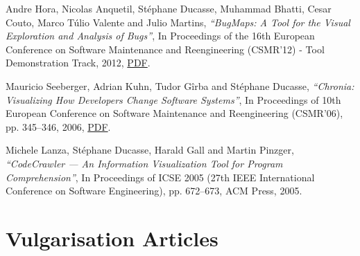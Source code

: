 \documentclass{article}
\newcommand{\czauthors}[1]{#1}
\newcommand{\cztitle}[1]{\emph{``#1''}}
\newcommand{\czbooktitle}[1]{#1}
\begin{document}
\begin{itemize}

	\pub  \czauthors{Andre Hora, Nicolas Anquetil, St\'ephane Ducasse, Muhammad Bhatti, Cesar Couto, Marco T\'ulio Valente and Julio Martins},  \cztitle{BugMaps: A Tool for the Visual Exploration and Analysis of Bugs},  In \czbooktitle{Proceedings of the 16th European Conference on Software Maintenance and Reengineering (CSMR'12) - Tool Demonstration Track}, 2012, \href{http://rmod-files.lille.inria.fr/Team/Texts/Papers/Hora12a-Official-CSMR2012Tools-BugMaps.pdf}{PDF}.

	\pub  \czauthors{Mauricio Seeberger, Adrian Kuhn, Tudor G\^irba and St\'ephane Ducasse},  \cztitle{{Chronia}: Visualizing How Developers Change Software Systems},  In \czbooktitle{Proceedings of 10th European Conference on Software Maintenance and Reengineering (CSMR'06)}, pp. 345--346, 2006, \href{http://rmod-files.lille.inria.fr/Team/Texts/Papers/Seeb06bChronia.pdf}{PDF}.

	\pub  \czauthors{Michele Lanza, St\'ephane Ducasse, Harald Gall and Martin Pinzger},  \cztitle{CodeCrawler --- An Information Visualization Tool for Program Comprehension},  In \czbooktitle{Proceedings of ICSE 2005 (27th IEEE International Conference on Software Engineering)}, pp. 672--673, ACM Press, 2005.

\end{itemize}\section{Vulgarisation Articles}
\end{document}
